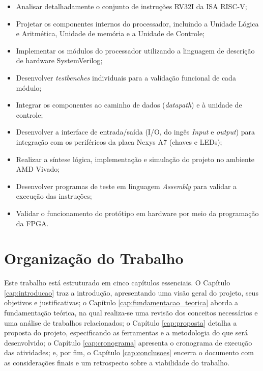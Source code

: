 \begin{itemize}
    \item Analisar detalhadamente o conjunto de instruções RV32I da ISA RISC-V;
    \item Projetar os componentes internos do processador, incluindo a Unidade Lógica e Aritmética, Unidade de memória e a Unidade de Controle;
    \item Implementar os módulos do processador utilizando a linguagem de descrição de hardware SystemVerilog;
    \item Desenvolver \textit{testbenches} individuais para a validação funcional de cada módulo;
    \item Integrar os componentes ao caminho de dados (\textit{datapath}) e à unidade de controle;
    \item Desenvolver a interface de entrada/saída (I/O, do ingês \textit{Input} e \textit{output}) para integração com os periféricos da placa Nexys A7 (chaves e LEDs);
    \item Realizar a síntese lógica, implementação e simulação do projeto no ambiente AMD Vivado;
    \item Desenvolver programas de teste em linguagem \textit{Assembly} para validar a execução das instruções;
    \item Validar o funcionamento do protótipo em hardware por meio da programação da FPGA.
\end{itemize}

\section{Organização do Trabalho}
Este trabalho está estruturado em cinco capítulos essenciais. O Capítulo \ref{cap:introducao} traz a introdução, apresentando uma visão geral do projeto, seus objetivos e justificativas; o Capítulo \ref{cap:fundamentacao_teorica} aborda a fundamentação teórica, na qual realiza-se uma revisão dos conceitos necessários e uma análise de trabalhos relacionados; o Capítulo \ref{cap:proposta} detalha a proposta do projeto, especificando as ferramentas e a metodologia do que será desenvolvido; o Capítulo \ref{cap:cronograma} apresenta o cronograma de execução das atividades; e, por fim, o Capítulo \ref{cap:conclusoes} encerra o documento com as considerações finais e um retrospecto sobre a viabilidade do trabalho.